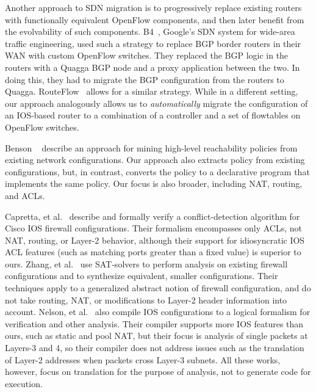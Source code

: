 

Another approach to SDN migration is to progressively replace existing routers with functionally equivalent
OpenFlow components, and then later benefit from the evolvability of such components.
B4~\cite{jain++:sigcomm13-google-sdn}, Google's SDN system for wide-area traffic engineering,
used such a strategy to replace BGP border routers in their WAN with custom OpenFlow switches.
They replaced
the BGP logic in the routers with a Quagga BGP node and a proxy application between
the two.  In doing this, they had to migrate the BGP configuration from the routers to Quagga.
RouteFlow~\cite{Rothenberg:2012routeflow} allows for a similar strategy.
While in a different setting, our approach analogously allows us to \emph{automatically} 
migrate the configuration of an IOS-based router to a combination of a controller and a 
set of flowtables on OpenFlow switches.

Benson \etal~\cite{benson09mining} describe an approach for mining
high-level reachability policies from 
existing network configurations.
Our approach also extracts policy from existing configurations,
but, in contrast, converts the policy to a declarative program that implements the same
policy. Our focus is also broader, including NAT, routing, and ACLs.

Capretta, et al.~\cite{capretta++:fmse07-firewalls} describe and
formally verify a conflict-detection algorithm for Cisco IOS firewall
configurations.  Their formalism encompasses only ACLs, not NAT,
routing, or Layer-2 behavior, although their support for idiosyncratic
IOS ACL features (such as matching ports greater than a fixed value)
is superior to ours. Zhang, et al.~\cite{zhang++:icnp2012-firewalls}
use SAT-solvers to perform analysis on existing firewall
configurations and to synthesize equivalent, smaller
configurations. Their techniques apply to a generalized abstract
notion of firewall configuration, and do not take routing, NAT, or
modifications to Layer-2 header information into account. 
Nelson, et al.~\cite{n++:lisa-margrave-firewalls} also compile IOS
configurations to a logical formalism for verification and other
analysis. Their compiler supports more IOS features
than ours, such as static and pool NAT,
but their focus is analysis of single
packets at Layers-3 and 4, so their compiler does not address issues such as the
translation of Layer-2 addresses when packets cross Layer-3
subnets. All these works, however, focus on translation for the
purpose of analysis, not to generate code for execution.

